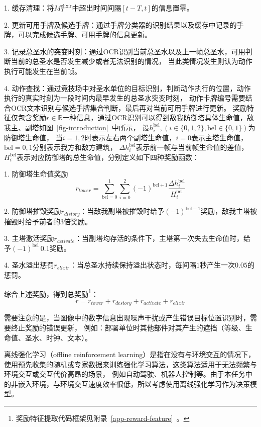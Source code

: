 1. 缓存清理：将$M_{T}^{\text{elixir}}$中超出时间间隔$[t-T,t]$的信息置零。

2. 更新可用手牌及候选手牌：通过手牌分类器的识别结果以及缓存中记录的手牌，可以完成候选手牌、可用手牌的信息更新。

3. 记录总圣水的突变时刻：通过OCR识别当前总圣水以及上一帧总圣水，可用判断当前的总圣水是否发生减少或者无法识别的情况，
当此类情况发生则认为动作执行可能发生在当前帧。

4. 动作查找：通过竞技场中对圣水单位的目标识别，判断动作执行的位置，动作执行的真实时刻为一段时间内最早发生的总圣水突变时刻，
动作卡牌编号需要结合OCR文本识别与候选手牌集合判断，最后再对当前可用手牌进行更新。
奖励特征仅包含奖励$r\in\mathbb{R}$一种信息，通过OCR识别可以得到敌我防御塔具体生命值，敌我主、副塔如图~\ref{fig-introduction}~中所示，
设$h_{i}^{\text{bel}}, (i\in\{0,1,2\},\text{bel}\in\{0,1\})$为防御塔生命值，
当$i=1,2$时表示左右两个副塔生命值，$i=0$表示主塔生命值，$\text{bel}=0,1$分别表示我方和敌方建筑，
$\Delta h_{i}^{\text{bel}}$表示前一帧与当前帧生命值的差值，$H_{i}^{\text{bel}}$表示对应防御塔的总生命值，分别定义如下四种奖励函数：

1. 防御塔生命值奖励
\begin{equation}
  r_{tower} = \sum_{\text{bel}=0}^1\sum_{i=0}^2(-1)^{\text{bel}+1}\frac{\Delta h_{i}^{\text{bel}}}{H_{i}^{\text{bel}}}
\end{equation}

2. 防御塔摧毁奖励$r_{distory}$：当敌我副塔被摧毁时给予$(-1)^{\text{bel}+1}$奖励，敌我主塔被摧毁时给予前者的$3$倍奖励。

3. 主塔激活奖励$r_{activate}$：当副塔均存活的条件下，主塔第一次失去生命值时，给予$(-1)^{\text{bel}}~0.1$奖励。

4. 圣水溢出惩罚$r_{elixir}$：当总圣水持续保持溢出状态时，每间隔$1$秒产生一次$0.05$的惩罚。

综合上述奖励，得到总奖励\footnote{奖励特征提取代码框架见附录~\ref{app-reward-feature}~。}：
\begin{equation}\label{eq-reward}
  r = r_{tower} + r_{destory} + r_{activate} + r_{elixir}
\end{equation}

需要注意的是，当图像中的数字信息出现噪声干扰或产生错误目标位置识别时，需要终止奖励的错误更新，
例如：部署单位时其他部件对其产生的遮挡（等级、生命值、圣水、时钟、文本）。

\label{sec-model}
\label{sec-offline-rl}
离线强化学习（offline reinforcement learning）是指在没有与环境交互的情况下，
使用预先收集的随机或专家数据来训练强化学习算法，这类算法适用于无法频繁与环境交互或交互代价高昂的场景，
例如自动驾驶、机器人控制等。由于本任务中的非嵌入环境，与环境交互速度效率很低，所以考虑使用离线强化学习作为决策模型。

